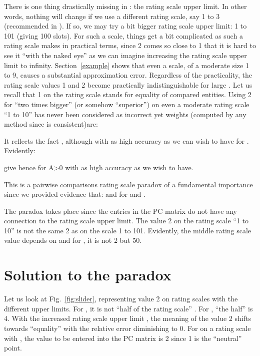\documentclass [12pt]{article}
\begin{document}
There is one thing drastically missing in : the rating scale upper limit. In other words, nothing will change if we use a different rating scale, say 1 to 3 (recommended in \cite{FKS2010}). If so, we may try a bit bigger rating scale upper limit: 1 to 101 (giving 100 slots). For such a scale, things get a bit complicated as such a rating scale makes  in practical terms, since 2 comes so close to 1 that it is hard to see it ``with the naked eye'' as we can imagine increasing the rating scale upper limit to infinity. Section~\ref{example} shows that even a scale, of a moderate size 1 to 9, causes a substantial approximation error. 
Regardless of the practicality, the rating scale values 1 and 2 become practically indistinguishable for large . Let us recall that 1 on the rating scale stands for equality of compared entities. Using 2 for ``two times bigger'' (or somehow ``superior'') on even a moderate rating scale ``1 to 10'' 
has never been considered as incorrect yet weights (computed by any method since  is consistent)are: 

 

\noindent It reflects the fact , although  with as high accuracy as we can wish to have for . \\

\noindent Evidently:


\noindent give  hence  for A>0 with as high accuracy as we wish to have.

This is a pairwise comparisons rating scale paradox of a fundamental importance since we provided evidence that:  and  for  and .

The paradox takes place since the entries in the PC matrix do not have any connection to the rating scale upper limit. The value 2 on the rating scale ``1 to 10'' is not the same 2 as on the scale 1 to 101.
Evidently, the middle rating scale value depends on  and for , it is not 2 but 50.

\section{Solution to the paradox}

Let us look at Fig.~\ref{fig:slider}, representing value 2 on rating scales with the different upper limits. For , it is not ``half of the rating scale'' . For , ``the half'' is 4. With the increased rating scale upper limit , the meaning of the value 2 shifts towards ``equality'' with the relative error diminishing to 0. For  on a rating scale with , the value to be entered into the PC matrix is 2 since 1 is the ``neutral'' point.
\end{document}
